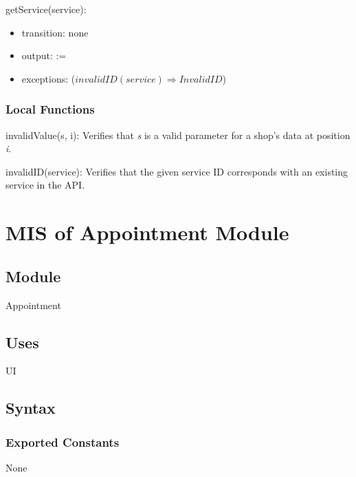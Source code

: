 \documentclass[12pt, titlepage]{article}
\begin{document}
\noindent getService(service):
\begin{itemize}
\item transition: none
\item output:  := 
\item exceptions: ($invalidID(service) \Rightarrow InvalidID$)
\end{itemize}

\subsubsection{Local Functions}

\noindent invalidValue(s, i): Verifies that \textit{s} is a valid parameter for a shop's data at position \textit{i}.

\noindent invalidID(service): Verifies that the given service ID corresponds with an existing service in the API.

\newpage

\section{MIS of Appointment Module} \label{mAppointment} 



\subsection{Module}

Appointment

\subsection{Uses}

UI

\subsection{Syntax}

\subsubsection{Exported Constants}

None
\end{document}

